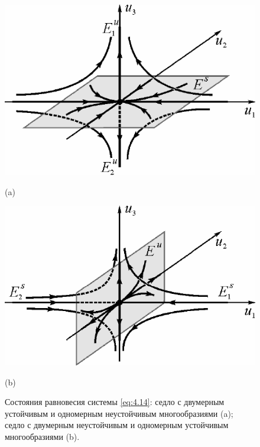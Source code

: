 \begin{figure}[h!]
        \centering
        \begin{minipage}{0.45\linewidth}
                \centering  
                \includegraphics[]{fig/lect4/3a}

                (a)
        \end{minipage}
        \begin{minipage}{0.45\linewidth}
                \centering  
                \includegraphics[]{fig/lect4/3b}

                (b)      
        \end{minipage}
        \caption{Состояния равновесия системы \eqref{eq:4.14}: седло с двумерным устойчивым и одномерным неустойчивым многообразиями (a); седло с двумерным неустойчивым и одномерным устойчивым многообразиями (b).}
        \label{fig:4.3}
\end{figure}

